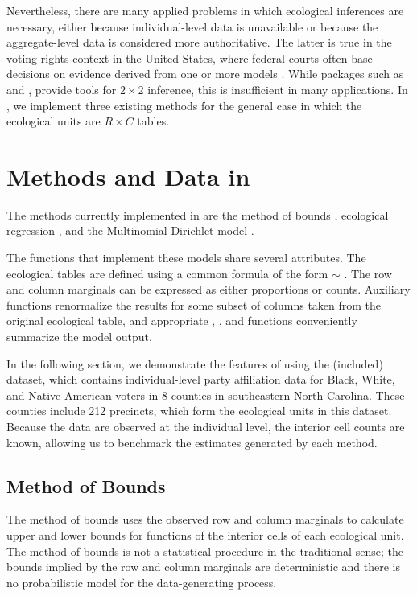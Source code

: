 Nevertheless, there are many applied problems in which ecological
inferences are necessary, either because individual-level data is
unavailable or because the aggregate-level data is considered more
authoritative.  The latter is true in the voting rights
context in the United States, where federal courts often base 
decisions on evidence derived from one or more  models
\citep{Cho01}.  While packages such as 
\citep{MartinQuinn06} and  \citep{eco}, provide tools for $2 \times 2$ inference, this is
insufficient in many applications. In , we implement
three existing methods for the general case in which the ecological units are $R \times C$ tables.



\section*{Methods and Data in }

The methods currently implemented in  are the method of
bounds \citep{DunDav53}, ecological regression \citep{Goodman53}, and
the Multinomial-Dirichlet model \citep{RosJiaKin01}.

The functions that implement these models share
several attributes.  The ecological tables are defined using a
common formula of the form  $\sim$
.  The row and column marginals can be
expressed as either proportions or counts.  Auxiliary functions
renormalize the results for some subset of columns taken from the
original ecological table, and appropriate ,
, and  functions conveniently summarize
the model output.

In the following section, we demonstrate the features of
 using the (included)  dataset, which
contains individual-level party affiliation data for Black, White, and
Native American voters in 8 counties in southeastern North Carolina.
These counties include 212 precincts, which form the ecological units
in this dataset.  Because the data are observed at the individual
level, the interior cell counts are known, allowing us to benchmark
the estimates generated by each method.

\subsection*{Method of Bounds}

The method of bounds \citep{DunDav53} uses the observed row and column
marginals to calculate upper and lower bounds for functions of the
interior cells of each ecological unit.  The method of bounds is not a
statistical procedure in the traditional sense; the bounds implied by
the row and column marginals are deterministic and there is no
probabilistic model for the data-generating process.

